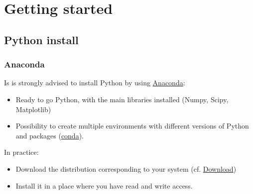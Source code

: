 \section{Getting started}

\subsection{Python install}

\begin{frame}[fragile]
\frametitle{Anaconda}

Is is strongly advised to install Python by using \href{https://www.anaconda.com/}{Anaconda}:
\begin{itemize}
    \item Ready to go Python, with the main libraries installed (Numpy, Scipy, Matplotlib)
    \item Possibility to create multiple environments with different versions of Python and packages (\href{https://conda.io/en/latest/}{conda}).
\end{itemize}

\vspace{1em}
In practice:
\begin{itemize}
    \item{Download the distribution corresponding to your system (cf. \href{https://www.anaconda.com/distribution/#download-section}{Download})}
    \item Install it in a place where you have read and write access.
\end{itemize}
\end{frame}

